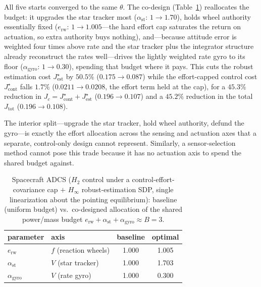 \documentclass[twocolumn,amsthm]{autart}
\begin{document}
All five starts converged to the same $\theta$.
The co-design (Table~\ref{tab:adcs}) reallocates the budget:
it upgrades the star tracker most ($\alpha_{\mathrm{st}}\!:\,1\to1.70$), holds wheel
authority essentially fixed ($e_{\mathrm{rw}}\!:\,1\to1.005$---the hard effort cap
saturates the return on actuation, so extra authority buys nothing), and---because
attitude error is weighted four times above rate and the star tracker plus the
integrator structure already reconstruct the rates well---drives the lightly weighted
rate gyro to its floor ($\alpha_{\mathrm{gyro}}\!:\,1\to0.30$), spending that budget
where it pays.
This cuts the robust estimation cost $J_{\mathrm{est}}^\star$ by $50.5\%$
($0.175\to0.087$) while the effort-capped control cost $J_{\mathrm{cont}}^\star$
falls $1.7\%$ ($0.0211\to0.0208$, the effort term held at the cap), for a $45.3\%$
reduction in $J_c=J_{\mathrm{cont}}^\star+J_{\mathrm{est}}^\star$ ($0.196\to0.107$)
and a $45.2\%$ reduction in the total $J_{\mathrm{tot}}$ ($0.196\to0.108$).

The interior split---upgrade the star tracker, hold wheel authority, defund the
gyro---is exactly the effort allocation across the
sensing and actuation axes that a separate, control-only design cannot represent.
Similarly, a sensor-selection method \cite{joshi2009sensor,tzoumas2016sensor} cannot pose
this trade because it has no actuation axis to spend the shared budget against.

\begin{table}[t]
\centering
\caption{Spacecraft ADCS ($H_2$ control under a control-effort-covariance cap $+$
$H_\infty$ robust-estimation SDP, single
linearization about the pointing equilibrium): baseline (uniform budget) vs.\
co-designed allocation of the shared power/mass budget
$e_{\mathrm{rw}}+\alpha_{\mathrm{st}}+\alpha_{\mathrm{gyro}}\approx B=3$.}
\label{tab:adcs}
\begin{tabular}{llcc}
\hline
parameter & axis & baseline & optimal \\
\hline
$e_{\mathrm{rw}}$       & $f$ (reaction wheels) & 1.000 & 1.005 \\
$\alpha_{\mathrm{st}}$  & $V$ (star tracker)    & 1.000 & 1.703 \\
$\alpha_{\mathrm{gyro}}$& $V$ (rate gyro)       & 1.000 & 0.300 \\
\hline
\end{tabular}
\end{table}

\end{document}
